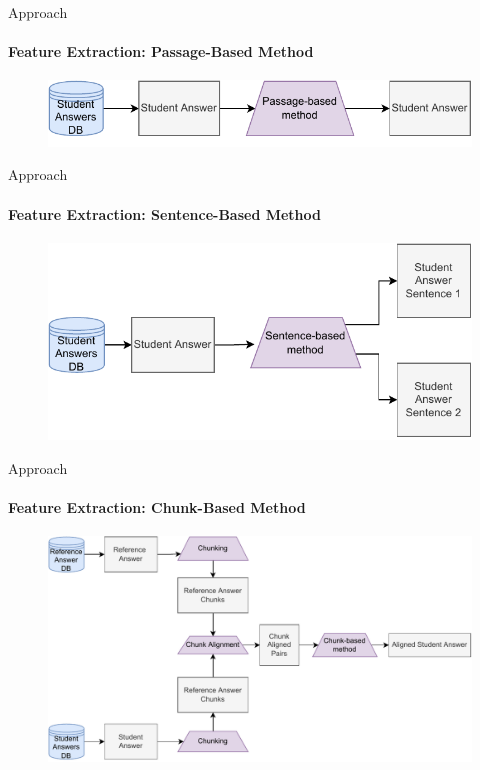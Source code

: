 \documentclass[aspectratio=169]{beamer}
\begin{document}
\begin{frame}{Approach}
\framesubtitle{Feature Extraction: Passage-Based Method}
\begin{figure}
	\centering
	\includegraphics[scale = 1]{images/passage_FE_slides.pdf}
	\label{fig:passage fe slides}
\end{figure}
\end{frame}
\begin{frame}{Approach}
\framesubtitle{Feature Extraction: Sentence-Based Method}
\begin{figure}
	\centering
	\includegraphics[scale = 1]{images/sentence_FE_slides.pdf}
	\label{fig:sentence fe slides}
\end{figure}
\end{frame}
\begin{frame}{Approach}
\framesubtitle{Feature Extraction: Chunk-Based Method}
\begin{figure}
	\centering
	\includegraphics[scale = 0.6]{images/chunk_FE_slides.pdf}
	\label{fig:chunk fe}
\end{figure}
\end{frame}
\end{document}
